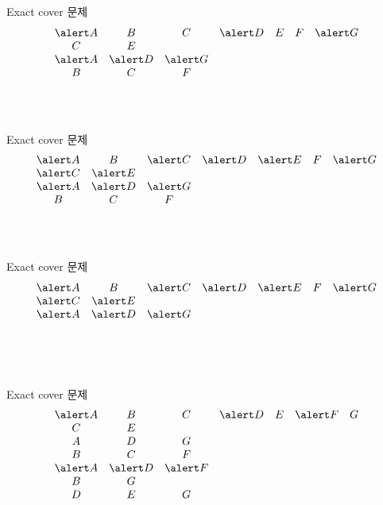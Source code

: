 \documentclass{beamer}
\begin{document}
%
\begin{frame}{Exact cover 문제} 
  $$
  \begin{array}{ccccccc}
    \alert A & B & C & \alert D & E & F & \alert G\\
    C & E &&&&&\\
    \alert A & \alert D & \alert G &&&&\\
    B & C & F &&&&\\
    &&&&&&\\
    &&&&&&\\
    &&&&&&
  \end{array}
  $$
\end{frame}

%
\begin{frame}{Exact cover 문제} 
  $$
  \begin{array}{ccccccc}
    \alert A & B & \alert C & \alert D & \alert E & F & \alert G\\
    \alert C & \alert E &&&&&\\
    \alert A & \alert D & \alert G &&&&\\
    B & C & F &&&&\\
    &&&&&&\\
    &&&&&&\\
    &&&&&&
  \end{array}
  $$
\end{frame}

%
\begin{frame}{Exact cover 문제} 
  $$
  \begin{array}{ccccccc}
    \alert A & B & \alert C & \alert D & \alert E & F & \alert G\\
    \alert C & \alert E &&&&&\\
    \alert A & \alert D & \alert G &&&&\\
    &&&&&&\\
    &&&&&&\\
    &&&&&&\\
    &&&&&&
  \end{array}
  $$
\end{frame}

%
\begin{frame}{Exact cover 문제} 
  $$
  \begin{array}{ccccccc}
    \alert A & B & C & \alert D & E & \alert F & G\\
    C & E &&&&&\\
    A & D & G &&&&\\
    B & C & F &&&&\\
    \alert A & \alert D & \alert F &&&&\\
    B & G &&&&&\\
    D & E & G &&&&
  \end{array}
  $$
\end{frame}
\end{document}
